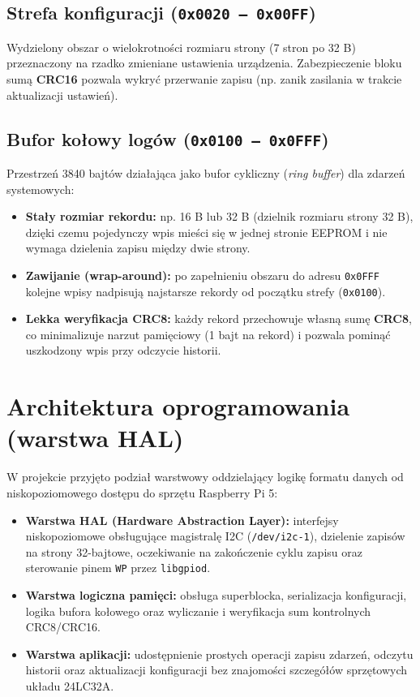 \documentclass[11pt, a4paper]{article}
\begin{document}
\subsection{Strefa konfiguracji (\texttt{0x0020 -- 0x00FF})}
Wydzielony obszar o wielokrotności rozmiaru strony (7 stron po 32 B) przeznaczony na rzadko zmieniane ustawienia urządzenia. Zabezpieczenie bloku sumą \textbf{CRC16} pozwala wykryć przerwanie zapisu (np. zanik zasilania w trakcie aktualizacji ustawień).

\subsection{Bufor kołowy logów (\texttt{0x0100 -- 0x0FFF})}
Przestrzeń 3840 bajtów działająca jako bufor cykliczny (\textit{ring buffer}) dla zdarzeń systemowych:
\begin{itemize}
    \item \textbf{Stały rozmiar rekordu:} np. 16 B lub 32 B (dzielnik rozmiaru strony 32 B), dzięki czemu pojedynczy wpis mieści się w jednej stronie EEPROM i nie wymaga dzielenia zapisu między dwie strony.
    \item \textbf{Zawijanie (wrap-around):} po zapełnieniu obszaru do adresu \texttt{0x0FFF} kolejne wpisy nadpisują najstarsze rekordy od początku strefy (\texttt{0x0100}).
    \item \textbf{Lekka weryfikacja CRC8:} każdy rekord przechowuje własną sumę \textbf{CRC8}, co minimalizuje narzut pamięciowy (1 bajt na rekord) i pozwala pominąć uszkodzony wpis przy odczycie historii.
\end{itemize}

\section{Architektura oprogramowania (warstwa HAL)}
W projekcie przyjęto podział warstwowy oddzielający logikę formatu danych od niskopoziomowego dostępu do sprzętu Raspberry Pi 5:
\begin{itemize}
    \item \textbf{Warstwa HAL (Hardware Abstraction Layer):} interfejsy niskopoziomowe obsługujące magistralę I2C (\texttt{/dev/i2c-1}), dzielenie zapisów na strony 32-bajtowe, oczekiwanie na zakończenie cyklu zapisu oraz sterowanie pinem \texttt{WP} przez \texttt{libgpiod}.
    \item \textbf{Warstwa logiczna pamięci:} obsługa superblocka, serializacja konfiguracji, logika bufora kołowego oraz wyliczanie i weryfikacja sum kontrolnych CRC8/CRC16.
    \item \textbf{Warstwa aplikacji:} udostępnienie prostych operacji zapisu zdarzeń, odczytu historii oraz aktualizacji konfiguracji bez znajomości szczegółów sprzętowych układu 24LC32A.
\end{itemize}
\end{document}
